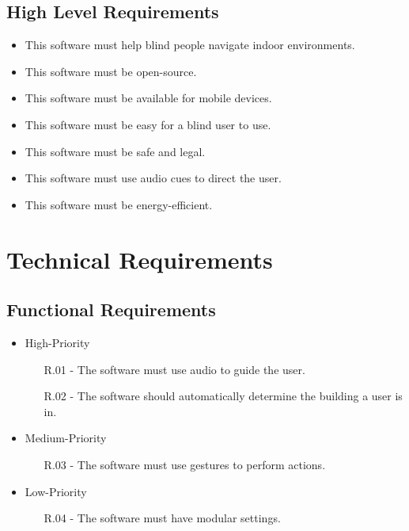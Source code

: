 \documentclass{scrreprt}
\begin{document}
	\section{High Level Requirements}
	\begin{itemize}
		\item This software must help blind people navigate indoor environments.
		
		\item This software must be open-source.
		
		\item This software must be available for mobile devices.
		
		\item This software must be easy for a blind user to use.
		
		\item This software must be safe and legal.
		
		\item This software must use audio cues to direct the user.
		
		\item This software must be energy-efficient.
	\end{itemize}

\chapter{Technical Requirements}

	\section{Functional Requirements}
	\begin{itemize}
		\item High-Priority
		\begin{itemize}
			\item[R.01 -] The software must use audio to guide the user.
			\item[R.02 -] The software should automatically determine the building a user is in.
		\end{itemize}
		
		\item Medium-Priority
		\begin{itemize}
			\item[R.03 -] The software must use gestures to perform actions.
		\end{itemize}
		
		\item Low-Priority
		\begin{itemize}
			\item[R.04 -] The software must have modular settings.
		\end{itemize}
	\end{itemize}
\end{document}
